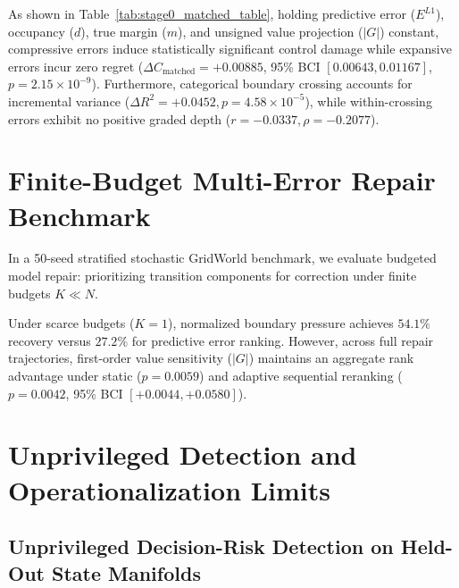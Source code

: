 \documentclass[journal,10pt,twocolumn]{IEEEtran}
\begin{document}
As shown in Table~\ref{tab:stage0_matched_table}, holding predictive error ($E^{L1}$), occupancy ($d$), true margin ($m$), and unsigned value projection ($|G|$) constant, compressive errors induce statistically significant control damage while expansive errors incur zero regret ($\Delta C_{\mathrm{matched}} = +0.00885$, 95\% BCI $[0.00643, 0.01167]$, $p = 2.15 \times 10^{-9}$). Furthermore, categorical boundary crossing accounts for incremental variance ($\Delta R^2 = +0.0452, p = 4.58 \times 10^{-5}$), while within-crossing errors exhibit no positive graded depth ($r = -0.0337, \rho = -0.2077$).

\section{Finite-Budget Multi-Error Repair Benchmark}
\label{sec:finite_budget_repair_benchmark}

In a 50-seed stratified stochastic GridWorld benchmark, we evaluate budgeted model repair: prioritizing transition components for correction under finite budgets $K \ll N$.

Under scarce budgets ($K=1$), normalized boundary pressure achieves $54.1\%$ recovery versus $27.2\%$ for predictive error ranking. However, across full repair trajectories, first-order value sensitivity ($|G|$) maintains an aggregate rank advantage under static ($p=0.0059$) and adaptive sequential reranking ($p=0.0042$, 95\% BCI $[+0.0044, +0.0580]$).

\section{Unprivileged Detection and Operationalization Limits}
\label{sec:finite_sample_estimation_scaling}

\subsection{Unprivileged Decision-Risk Detection on Held-Out State Manifolds}
\label{subsec:unprivileged_detection_held_out}
\end{document}
